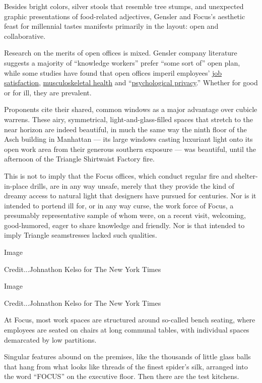 Besides bright colors, silver stools that resemble tree stumps, and
unexpected graphic presentations of food-related adjectives, Gensler and
Focus's aesthetic feast for millennial tastes manifests primarily in the
layout: open and collaborative.

Research on the merits of open offices is mixed. Gensler company
literature suggests a majority of ``knowledge workers'' prefer ``some
sort of'' open plan, while some studies have found that open offices
imperil employees'
\href{https://www.ncbi.nlm.nih.gov/pubmed/29334117}{job satisfaction},
\href{https://www.ncbi.nlm.nih.gov/pubmed/11055149}{musculoskeletal
health} and
``\href{https://journals.aom.org/doi/full/10.5465/255498}{psychological
privacy}.'' Whether for good or for ill, they are prevalent.

Proponents cite their shared, common windows as a major advantage over
cubicle warrens. These airy, symmetrical, light-and-glass-filled spaces
that stretch to the near horizon are indeed beautiful, in much the same
way the ninth floor of the Asch building in Manhattan --- its large
windows casting luxuriant light onto its open work area from their
generous southern exposure --- was beautiful, until the afternoon of the
Triangle Shirtwaist Factory fire.

This is not to imply that the Focus offices, which conduct regular fire
and shelter-in-place drills, are in any way unsafe, merely that they
provide the kind of dreamy access to natural light that designers have
pursued for centuries. Nor is it intended to portend ill for, or in any
way curse, the work force of Focus, a presumably representative sample
of whom were, on a recent visit, welcoming, good-humored, eager to share
knowledge and friendly. Nor is that intended to imply Triangle
seamstresses lacked such qualities.

Image

Credit...Johnathon Kelso for The New York Times

Image

Credit...Johnathon Kelso for The New York Times

At Focus, most work spaces are structured around so-called bench
seating, where employees are seated on chairs at long communal tables,
with individual spaces demarcated by low partitions.

Singular features abound on the premises, like the thousands of little
glass balls that hang from what looks like threads of the finest
spider's silk, arranged into the word ``FOCUS'' on the executive floor.
Then there are the test kitchens.


